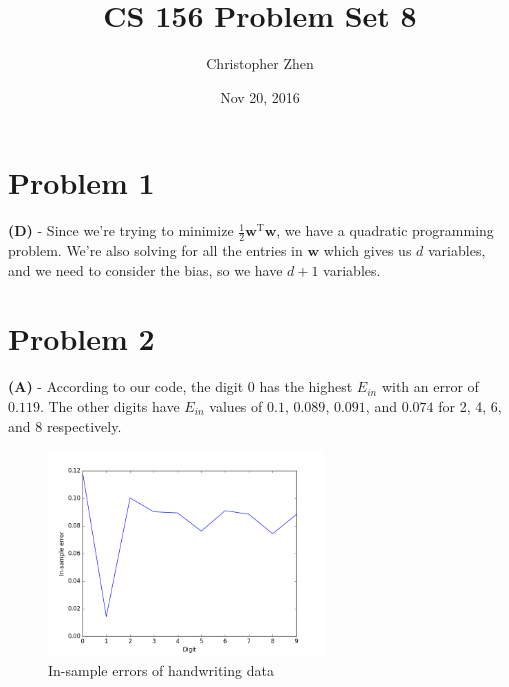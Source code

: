\documentclass[10pt,letter]{article}
\begin{document}


\title{CS 156 Problem Set 8}

\author{Christopher Zhen}

\date{Nov 20, 2016}
 
\maketitle 
	
\section*{Problem 1}

\textbf{(D)} - Since we're trying to minimize $\frac{1}{2}\mathbf{w}^\textrm{T}\mathbf{w}$, we have a quadratic programming problem. We're also solving for all the entries in $\textbf{w}$ which gives us $d$ variables, and we need to consider the bias, so we have $d+1$ variables.

\section*{Problem 2}

\textbf{(A)} - According to our code, the digit $0$ has the highest $E_{in}$ with an error of $0.119$. The other digits have $E_{in}$ values of $0.1$, $0.089$, $0.091$, and $0.074$ for 2, 4, 6, and 8 respectively.

\begin{figure}[H]
\begin{center}
\includegraphics[width=0.65\textwidth]{p2.png}
\caption{In-sample errors of handwriting data}
\end{center}
\end{figure}
\end{document}
